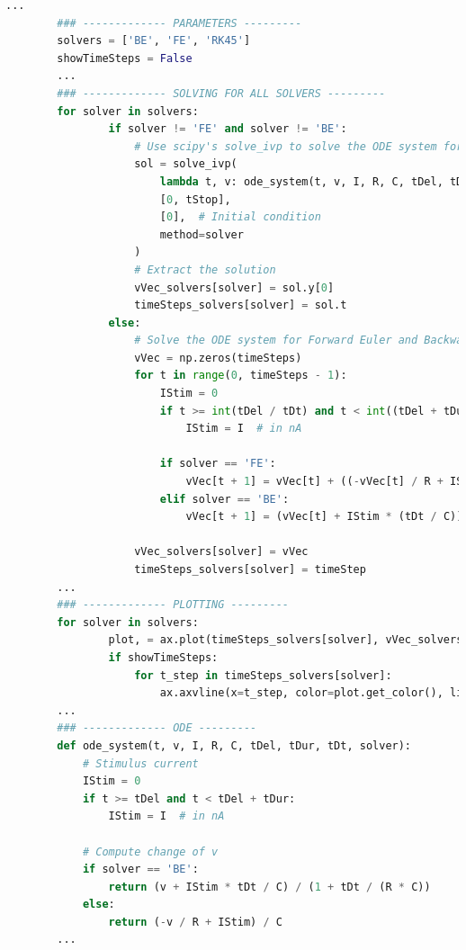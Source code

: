 \documentclass{article}
\begin{document}
    \begin{lstlisting}[language=Python, style=mystyle]
        ...
        ### ------------- PARAMETERS ---------
        solvers = ['BE', 'FE', 'RK45']
        showTimeSteps = False
        ...
        ### ------------- SOLVING FOR ALL SOLVERS ---------
        for solver in solvers:
                if solver != 'FE' and solver != 'BE':
                    # Use scipy's solve_ivp to solve the ODE system for the built-in solver
                    sol = solve_ivp(
                        lambda t, v: ode_system(t, v, I, R, C, tDel, tDur, tDt, solver),
                        [0, tStop],
                        [0],  # Initial condition
                        method=solver
                    )
                    # Extract the solution
                    vVec_solvers[solver] = sol.y[0]
                    timeSteps_solvers[solver] = sol.t
                else:
                    # Solve the ODE system for Forward Euler and Backward Euler
                    vVec = np.zeros(timeSteps)
                    for t in range(0, timeSteps - 1):
                        IStim = 0
                        if t >= int(tDel / tDt) and t < int((tDel + tDur) / tDt):
                            IStim = I  # in nA

                        if solver == 'FE':
                            vVec[t + 1] = vVec[t] + ((-vVec[t] / R + IStim) / C) * tDt
                        elif solver == 'BE':
                            vVec[t + 1] = (vVec[t] + IStim * (tDt / C)) / (1 + tDt / (R * C))

                    vVec_solvers[solver] = vVec
                    timeSteps_solvers[solver] = timeStep
        ...
        ### ------------- PLOTTING ---------
        for solver in solvers:
                plot, = ax.plot(timeSteps_solvers[solver], vVec_solvers[solver], label=solver+' Nr. Timesteps='+str(timeSteps_solvers[solver].size))
                if showTimeSteps:
                    for t_step in timeSteps_solvers[solver]:
                        ax.axvline(x=t_step, color=plot.get_color(), linestyle='--', linewidth=0.8)
        ...
        ### ------------- ODE ---------
        def ode_system(t, v, I, R, C, tDel, tDur, tDt, solver):
            # Stimulus current
            IStim = 0
            if t >= tDel and t < tDel + tDur:
                IStim = I  # in nA

            # Compute change of v
            if solver == 'BE':
                return (v + IStim * tDt / C) / (1 + tDt / (R * C))
            else:
                return (-v / R + IStim) / C
        ...
    \end{lstlisting}
\end{document}
